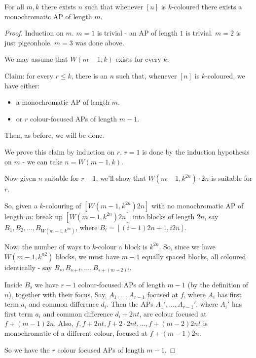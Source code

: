 \documentclass[10pt,a4paper]{article}
\begin{document}
\begin{theorem}
  For all $m, k$ there exists $n$ such that whenever $[n]$ is $k$-coloured there exists a monochromatic AP of length $m$.
\end{theorem}
\begin{proof}
  Induction on $m$. $m=1$ is trivial - an AP of length $1$ is trivial. $m=2$ is just pigeonhole. $m=3$ was done above.

  We may assume that $W(m-1, k)$ exists for every $k$.

  Claim: for every $r \leq k$, there is an $n$ such that, whenever $[n]$ is $k$-coloured, we have either:
  \begin{itemize}
    \item a monochromatic AP of length $m$.
    \item or $r$ colour-focused APs of length $m-1$.
  \end{itemize}
  Then, as before, we will be done.

  We prove this claim by induction on $r$. $r=1$ is done by the induction hypothesis on $m$ -  we can take $n= W(m-1, k)$.

  Now given $n$ suitable for $r-1$, we'll show that $W(m-1, k^{2n})\cdot 2n$ is suitable for $r$.

  So, given a $k$-colouring of $[W(m-1, k^{2n})2n]$ with no monochromatic AP of length $m$: break up $[W(m-1, k^{2n})2n]$ into blocks of length $2n$, say $B_1, B_2, \ldots, B_{W(m-1, k^{2n})}$, where $B_i = [(i-1)2n + 1, i2n]$.

  Now, the number of ways to $k$-colour a block is $k^{2n}$. So, since we have $W(m-1, k^{n2})$ blocks, we must have $m-1$ equally spaced blocks, all coloured identically - say $B_s, B_{s+t}, \ldots, B_{s+(m-2)t}$.

  Inside $B_s$ we have $r-1$ colour-focused APs of length $m-1$ (by the definition of $n$), together with their focus. Say, $A_1, \ldots, A_{r-1}$ focused at $f$, where $A_i$ has first term $a_i$ and common difference $d_i$. Then the APs $A_1', \ldots, A_{r-1}'$, where $A_i'$ has first term $a_i$ and common difference $d_i + 2nt$, are colour focused at $f+(m-1)2n$. Also, $f, f +2nt, f+2\cdot 2nt, \ldots, f+(m-2)2nt$ is monochromatic of a different colour, focused at $f+(m-1)2n$.

  So we have the $r$ colour focused APs of length $m-1$.
\end{proof}
\end{document}
